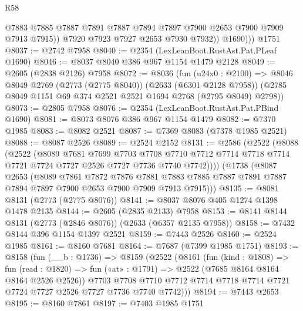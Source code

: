 \begin{lexlean}{R58}
\begin{coremodule}
                @7883
                @7885
                @7887
                @7891
                @7887
                @7894
                @7897
                @7900
                @2653
                @7900
                @7909
                @7913
                @7915))
            @7920
            @7923
            @7927
            @2653
            @7930
            @7932))
          @1690)))
    @1751
@8037 := @2742 @7958
@8040 := @2354 (LexLeanBoot.RustAst.Pat.PLeaf @1690)
@8046 := @8037 @8040 @386 @967 @1154 @1479 @2128
@8049 := @2605 (@2838 @2126) @7958
@8072 := @8036
    (fun (u24x0 : @2100) =>
    @8046
      @8049
      @2769
      (@2773 (@2775 @8040))
      (@2633 (@6301 @2128 @7958))
      (@2785 @8049 @1151 @69 @374 @2521 @2521 @1694 @2768 (@2795 @8049) @2798))
@8073 := @2805 @7958
@8076 := @2354 (LexLeanBoot.RustAst.Pat.PBind @1690)
@8081 := @8073 @8076 @386 @967 @1154 @1479
@8082 := @7370 @1985
@8083 := @8082 @2521
@8087 := @7369 @8083 (@7378 @1985 @2521)
@8088 := @8087 @2526
@8089 := @2524 @2152
@8131 := @2586
    (@2522
      (@8088
        (@2522
          (@8089
            @7681
            @7699
            @7703
            @7708
            @7710
            @7712
            @7714
            @7718
            @7714
            @7721
            @7724
            @7727
            @2526
            @7727
            @7736
            @7740
            @7742))))
    (@1738
      (@8087
        @2653
        (@8089
          @7861
          @7872
          @7876
          @7881
          @7883
          @7885
          @7887
          @7891
          @7887
          @7894
          @7897
          @7900
          @2653
          @7900
          @7909
          @7913
          @7915)))
@8135 := @8081 @8131 (@2773 (@2775 @8076))
@8141 := @8037 @8076 @405 @1274 @1398 @1478 @2135
@8144 := @2605 (@2835 @2133) @7958
@8153 := @8141 @8144 @8131 (@2773 (@2846 @8076)) (@2633 (@6357 @2135 @7958))
@8158 := @7432 @8144 @396 @1154 @1397 @2521
@8159 := @7443 @2526
@8160 := @2524 @1985
@8161 := @8160 @7681
@8164 := @7687 (@7399 @1985 @1751)
@8193 := @8158
    (fun (__b : @1736) =>
    @8159
      (@2522
        (@8161
          (fun (kind : @1808) =>
          fun (read : @1820) => fun («at» : @1791) => @2522 (@7685 @8164 @8164 @8164 @2526 @2526))
          @7703
          @7708
          @7710
          @7712
          @7714
          @7718
          @7714
          @7721
          @7724
          @7727
          @2526
          @7727
          @7736
          @7740
          @7742)))
@8194 := @7443 @2653
@8195 := @8160 @7861
@8197 := @7403 @1985 @1751

\end{coremodule}
\end{lexlean}
